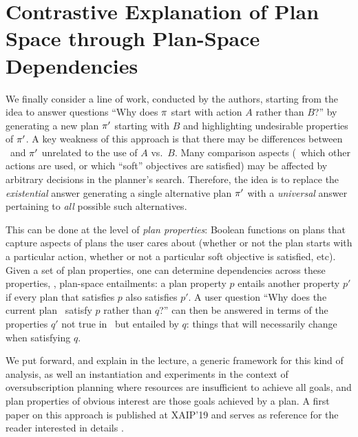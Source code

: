 \section{Contrastive Explanation of Plan Space through Plan-Space Dependencies}
\label{xpp}

We finally consider a line of work, conducted by the authors, starting
from the idea to answer questions ``Why does $\pi$ start with action
$A$ rather than $B$?'' by generating a new plan $\pi'$ starting with
$B$ and highlighting undesirable properties of $\pi'$. A key
weakness of this approach is that there may be differences between
\plan\ and $\pi'$ unrelated to the use of $A$ vs.\ $B$. Many
comparison aspects (\eg\ which other actions are used, or which
``soft'' objectives are satisfied) may be affected by arbitrary
decisions in the planner's search. Therefore, the idea is to replace
the \emph{existential} answer generating a single alternative plan
$\pi'$ with a \emph{universal} answer pertaining to \emph{all}
possible such alternatives.

This can be done at the level of \emph{plan properties}: Boolean
functions on plans that capture aspects of plans the user cares about
(whether or not the plan starts with a particular action, whether or
not a particular soft objective is satisfied, etc). Given a set of
plan properties, one can determine dependencies across these
properties, \ie, plan-space entailments: a plan property $p$ entails
another property $p'$ if every plan that satisfies $p$ also satisfies
$p'$. A user question ``Why does the current plan \plan\ satisfy $p$
rather than $q$?'' can then be answered in terms of the properties
$q'$ not true in \plan\ but entailed by $q$: things that will
necessarily change when satisfying $q$.

We put forward, and explain in the lecture, a generic framework for
this kind of analysis, as well an instantiation and experiments in the
context of oversubscription planning
\cite{smith:icaps-04,domshlak:mirkis:jair-15} where resources are
insufficient to achieve all goals, and plan properties of obvious
interest are those goals achieved by a plan. A first paper on this
approach is published at XAIP'19 and serves as reference for the
reader interested in details \cite{eifler:etal:xaip-19}.
